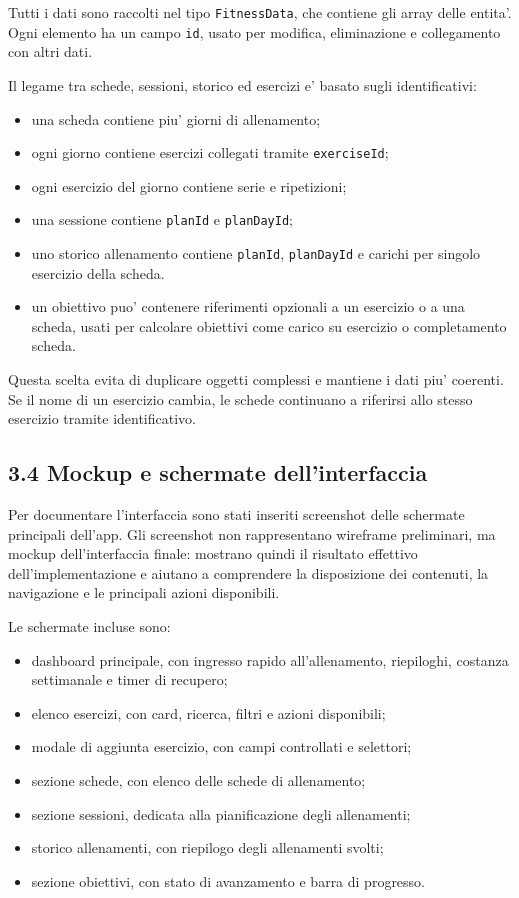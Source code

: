 \documentclass[11pt,a4paper]{article}
\begin{document}
Tutti i dati sono raccolti nel tipo \texttt{FitnessData}, che contiene gli array delle entita'. Ogni elemento ha un campo \texttt{id}, usato per modifica, eliminazione e collegamento con altri dati.

Il legame tra schede, sessioni, storico ed esercizi e' basato sugli identificativi:

\begin{itemize}
  \item una scheda contiene piu' giorni di allenamento;
  \item ogni giorno contiene esercizi collegati tramite \texttt{exerciseId};
  \item ogni esercizio del giorno contiene serie e ripetizioni;
  \item una sessione contiene \texttt{planId} e \texttt{planDayId};
  \item uno storico allenamento contiene \texttt{planId}, \texttt{planDayId} e carichi per singolo esercizio della scheda.
  \item un obiettivo puo' contenere riferimenti opzionali a un esercizio o a una scheda, usati per calcolare obiettivi come carico su esercizio o completamento scheda.
\end{itemize}

Questa scelta evita di duplicare oggetti complessi e mantiene i dati piu' coerenti. Se il nome di un esercizio cambia, le schede continuano a riferirsi allo stesso esercizio tramite identificativo.

\subsection{3.4 Mockup e schermate dell'interfaccia}

Per documentare l'interfaccia sono stati inseriti screenshot delle schermate principali dell'app. Gli screenshot non rappresentano wireframe preliminari, ma mockup dell'interfaccia finale: mostrano quindi il risultato effettivo dell'implementazione e aiutano a comprendere la disposizione dei contenuti, la navigazione e le principali azioni disponibili.

Le schermate incluse sono:

\begin{itemize}
  \item dashboard principale, con ingresso rapido all'allenamento, riepiloghi, costanza settimanale e timer di recupero;
  \item elenco esercizi, con card, ricerca, filtri e azioni disponibili;
  \item modale di aggiunta esercizio, con campi controllati e selettori;
  \item sezione schede, con elenco delle schede di allenamento;
  \item sezione sessioni, dedicata alla pianificazione degli allenamenti;
  \item storico allenamenti, con riepilogo degli allenamenti svolti;
  \item sezione obiettivi, con stato di avanzamento e barra di progresso.
\end{itemize}
\end{document}
